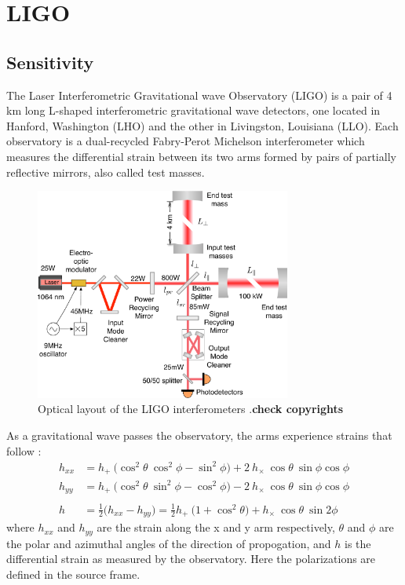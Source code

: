 \documentclass [12pt, proquest]{uwthesis}[2019]
\begin{document}
\section{LIGO}

\subsection{Sensitivity}

The Laser Interferometric Gravitational wave Observatory (LIGO) \cite{aLIGO} is a pair of 4 km long L-shaped interferometric gravitational wave detectors, one located in Hanford, Washington (LHO) and the other in Livingston, Louisiana (LLO). Each observatory is a dual-recycled Fabry-Perot Michelson interferometer which measures the differential strain between its two arms formed by pairs of partially reflective mirrors, also called test masses. 

\begin{figure}%
\begin{center}
\includegraphics[width=0.75\textwidth]{LIGO_Schematic.pdf}
\caption[Optical layout of the LIGO interferometers]{Optical layout of the LIGO interferometers \cite{LIGOSens}.\textbf{check copyrights}}
\label{LIGO_Schematic}
\end{center}
\end{figure}

As a gravitational wave passes the observatory, the arms experience strains that follow \cite{GWBook}:
\begin{align}
h_{xx}&=h_+\ \big( \cos^2\theta\ \cos^2\phi-\sin^2\phi \big)+2\ h_\times\ \cos \theta\ \sin \phi \cos \phi \\
h_{yy}&=h_+\ \big( \cos^2\theta\ \sin^2\phi-\cos^2\phi \big)-2\ h_\times\ \cos \theta\ \sin \phi \cos \phi \\
\nonumber \\
h&=\frac{1}{2} \big( h_{xx}-h_{yy} \big)=\frac{1}{2}h_+\ \big( 1+\cos^2\theta \big)+ h_\times\ \cos \theta\ \sin 2 \phi 
\end{align}
where $h_{xx}$ and $h_{yy}$ are the strain along the x and y arm respectively, $\theta$ and $\phi$ are the polar and azimuthal angles of the direction of propogation, and $h$ is the differential strain as measured by the observatory. Here the polarizations are defined in the source frame.
\end{document}
